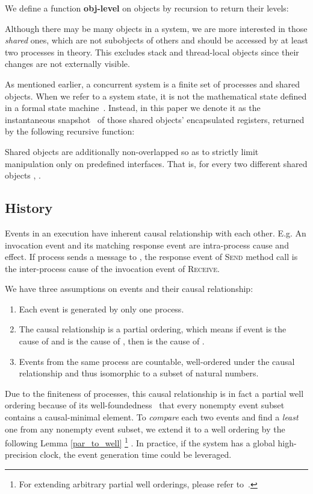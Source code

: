 \documentclass[a4paper,USenglish]{lipics-v2016}
\newcommand{\objlevel}{\textbf{obj-level}}
\begin{document}
We define a function {\objlevel} on objects by recursion to return their levels:



Although there may be many objects in a system, we are more interested in those \textit{shared} ones,
which are not subobjects of others and should be accessed by at least two processes in theory.
This excludes stack and thread-local objects since their changes are not externally visible.

As mentioned earlier, a concurrent system is a finite set of processes and shared objects.
When we refer to a system state,
it is not the mathematical state defined in a formal state machine~\cite{Baier08}.
Instead, in this paper we denote it as the instantaneous snapshot~\cite{Afek:1993:ASS:153724.153741} of those shared objects' encapsulated registers,
returned by the following recursive function:

Shared objects are additionally non-overlapped
so as to strictly limit manipulation only on predefined interfaces.
That is, for every two different shared objects , .

\subsection{History}\label{sec:history}

Events in an execution have inherent causal relationship with each other.
E.g. An invocation event and its matching response event are intra-process cause and effect.
If process  sends a message to , the response event of \textsc{Send} method call is the inter-process cause of the invocation event of \textsc{Receive}.

We have three assumptions on events and their causal relationship:
\begin{enumerate}[(1)]
	\item
	Each event is generated by only one process.
	\item
	The causal relationship is a partial ordering,
	which means if event  is the cause of  and  is the cause of , then  is the cause of .
	\item
	Events from the same process are countable, well-ordered under the causal relationship and thus isomorphic to a subset of natural numbers.
\end{enumerate}

Due to the finiteness of processes, this causal relationship is in fact a partial well ordering because of its well-foundedness~\cite{Enderton77} that every nonempty event subset contains a causal-minimal element.
To \textit{compare} each two events and find a \textit{least} one from any nonempty event subset,
we extend it to a well ordering
by the following Lemma \ref{par_to_well}
\footnote
{
	For extending arbitrary partial well orderings, please refer to~\cite{Lin-well2015}.
}
.
In practice, if the system has a global high-precision clock,
the event generation time could be leveraged.
\end{document}
